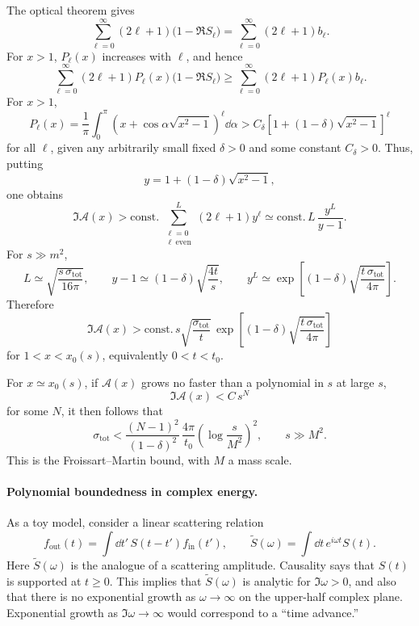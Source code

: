 The optical theorem gives
\[
  \sum_{\ell=0}^{\infty}(2\ell+1)\bigl(1-\Re S_\ell\bigr)
  =
  \sum_{\ell=0}^{\infty}(2\ell+1)b_\ell.
\]
For \(x>1\), \(P_\ell(x)\) increases with \(\ell\), and hence
\[
  \sum_{\ell=0}^{\infty}
  (2\ell+1)P_\ell(x)\bigl(1-\Re S_\ell\bigr)
  \geq
  \sum_{\ell=0}^{\infty}
  (2\ell+1)P_\ell(x)b_\ell.
\]
For \(x>1\),
\[
  P_\ell(x)
  =
  \frac{1}{\pi}\int_0^\pi
  \left(x+\cos\alpha\sqrt{x^2-1}\right)^\ell
  \dd\alpha
  >
  C_\delta
  \left[1+(1-\delta)\sqrt{x^2-1}\right]^\ell
\]
for all \(\ell\), given any arbitrarily small fixed \(\delta>0\) and
some constant \(C_\delta>0\).  Thus, putting
\[
  y=1+(1-\delta)\sqrt{x^2-1},
\]
one obtains
\[
  \Im\mathcal A(x)
  >
  \mathrm{const.}\,
  \sum_{\substack{\ell=0\\ \ell\ \mathrm{even}}}^{L}
  (2\ell+1)y^\ell
  \simeq
  \mathrm{const.}\,L\,\frac{y^L}{y-1}.
\]
For \(s\gg m^2\),
\[
  L\simeq
  \sqrt{\frac{s\,\sigma_{\mathrm{tot}}}{16\pi}},
  \qquad
  y-1\simeq(1-\delta)\sqrt{\frac{4t}{s}},
  \qquad
  y^L\simeq
  \exp\!\left[
    (1-\delta)\sqrt{\frac{t\,\sigma_{\mathrm{tot}}}{4\pi}}
  \right].
\]
Therefore
\[
  \Im\mathcal A(x)
  >
  \mathrm{const.}\,
  s\sqrt{\frac{\sigma_{\mathrm{tot}}}{t}}\,
  \exp\!\left[
    (1-\delta)\sqrt{\frac{t\,\sigma_{\mathrm{tot}}}{4\pi}}
  \right]
\]
for \(1<x<x_0(s)\), equivalently \(0<t<t_0\).

For \(x\simeq x_0(s)\), if \(\mathcal A(x)\) grows no faster than a
polynomial in \(s\) at large \(s\),
\[
  \Im\mathcal A(x)<C\,s^N
\]
for some \(N\), it then follows that
\[
  \sigma_{\mathrm{tot}}
  <
  \frac{(N-1)^2}{(1-\delta)^2}\,
  \frac{4\pi}{t_0}
  \left(\log\frac{s}{M^2}\right)^2,
  \qquad s\gg M^2.
\]
This is the Froissart--Martin bound, with \(M\) a mass scale.

\paragraph{Polynomial boundedness in complex energy.}
As a toy model, consider a linear scattering relation
\[
  f_{\mathrm{out}}(t)=
  \int \dd t'\,S(t-t')f_{\mathrm{in}}(t'),
  \qquad
  \widetilde S(\omega)=
  \int \dd t\,e^{i\omega t}S(t).
\]
Here \(\widetilde S(\omega)\) is the analogue of a scattering amplitude.
Causality says that \(S(t)\) is supported at \(t\geq 0\).  This implies
that \(\widetilde S(\omega)\) is analytic for \(\Im\omega>0\), and also
that there is no exponential growth as \(\omega\to\infty\) on the
upper-half complex plane.  Exponential growth as
\(\Im\omega\to\infty\) would correspond to a ``time advance.''

